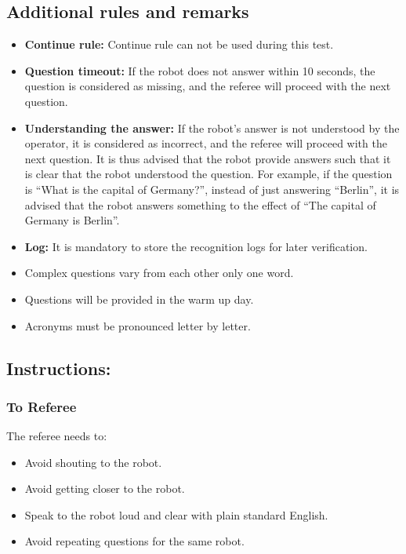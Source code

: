 \subsection*{Additional rules and remarks}
\begin{itemize}[nosep]
	\item \textbf{Continue rule:} Continue rule can not be used during this test.
	\item \textbf{Question timeout:} If the robot does not answer within 10 seconds, the question is considered as missing, and the referee will proceed with the next question.
	\item \textbf{Understanding the answer:} If the robot’s answer is not understood by the operator, it is considered as incorrect, and the referee will proceed with the next question. It is thus advised that the robot provide answers such that it is clear that the robot understood the question. For example, if the question is “What is the capital of Germany?”, instead of just answering “Berlin”, it is advised that the robot answers something to the effect of “The capital of Germany is Berlin”.
	\item \textbf{Log:} It is mandatory to store the recognition logs for later verification.
	\item Complex questions vary from each other only one word.
	\item Questions will be provided in the warm up day.
	\item Acronyms must be pronounced letter by letter.
\end{itemize}

\subsection*{Instructions:}
\subsubsection*{To Referee}

The referee needs to:
\begin{itemize}
	\item Avoid shouting to the robot.
	\item Avoid getting closer to the robot.
	\item Speak to the robot loud and clear with plain standard English.
	\item Avoid repeating questions for the same robot. 
\end{itemize}

